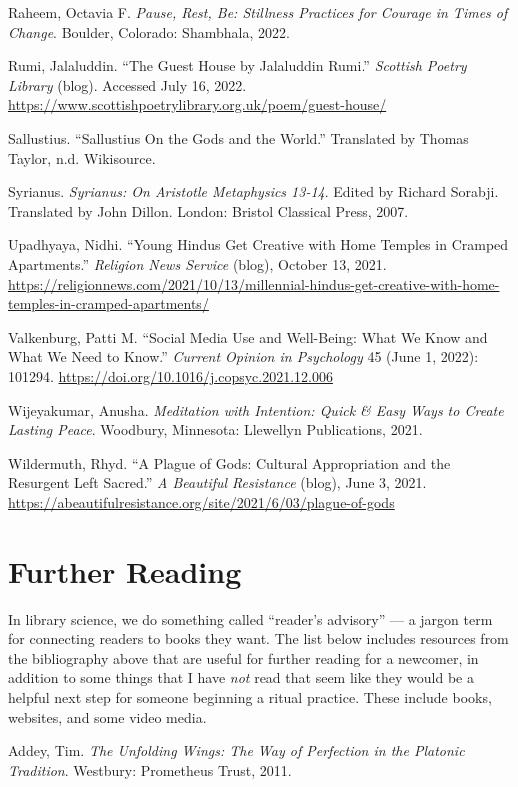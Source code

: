 \documentclass[
]{book}
\begin{document}
Raheem, Octavia F. \emph{Pause, Rest, Be: Stillness Practices for Courage in Times of Change}. Boulder, Colorado: Shambhala, 2022.

Rumi, Jalaluddin. ``The Guest House by Jalaluddin Rumi.'' \emph{Scottish Poetry Library} (blog). Accessed July 16, 2022. \url{https://www.scottishpoetrylibrary.org.uk/poem/guest-house/}

Sallustius. ``Sallustius On the Gods and the World.'' Translated by Thomas Taylor, n.d. Wikisource.

Syrianus. \emph{Syrianus: On Aristotle Metaphysics 13-14}. Edited by Richard Sorabji. Translated by John Dillon. London: Bristol Classical Press, 2007.

Upadhyaya, Nidhi. ``Young Hindus Get Creative with Home Temples in Cramped Apartments.'' \emph{Religion News Service} (blog), October 13, 2021. \url{https://religionnews.com/2021/10/13/millennial-hindus-get-creative-with-home-temples-in-cramped-apartments/}

Valkenburg, Patti M. ``Social Media Use and Well-Being: What We Know and What We Need to Know.'' \emph{Current Opinion in Psychology} 45 (June 1, 2022): 101294. \url{https://doi.org/10.1016/j.copsyc.2021.12.006}

Wijeyakumar, Anusha. \emph{Meditation with Intention: Quick \& Easy Ways to Create Lasting Peace}. Woodbury, Minnesota: Llewellyn Publications, 2021.

Wildermuth, Rhyd. ``A Plague of Gods: Cultural Appropriation and the Resurgent Left Sacred.'' \emph{A Beautiful Resistance} (blog), June 3, 2021. \url{https://abeautifulresistance.org/site/2021/6/03/plague-of-gods}

\hypertarget{further-reading}{%
\section{Further Reading}\label{further-reading}}

In library science, we do something called ``reader's advisory'' --- a jargon term for connecting readers to books they want. The list below includes resources from the bibliography above that are useful for further reading for a newcomer, in addition to some things that I have \emph{not} read that seem like they would be a helpful next step for someone beginning a ritual practice. These include books, websites, and some video media.

Addey, Tim. \emph{The Unfolding Wings: The Way of Perfection in the Platonic Tradition}. Westbury: Prometheus Trust, 2011.
\end{document}
